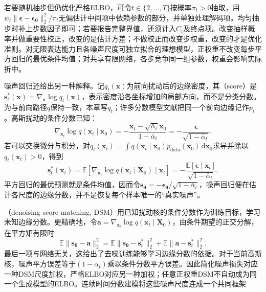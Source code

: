 若要随机抽步但仍优化严格ELBO，可令$t\in\{2,\ldots,T\}$按概率$\pi_t>0$抽取，用$w_t\lVert\bm{\epsilon}-\bm{\epsilon}_{\bm{\theta}}\rVert_2^2/\pi_t$无偏估计中间项中依赖参数的部分，并单独处理解码项。均匀抽步时补上步数因子即可；若要报告完整界值，还须计入$C_t$及终点项。改变抽样概率并做重要性校正，改变的是估计方差；不做校正而改变步权重，改变的才是优化准则。对无限表达能力且各噪声尺度可独立拟合的理想模型，正权重不改变每步平方回归的最优条件均值；对共享有限网络，各步竞争同一组参数，权重会影响实际折中。

噪声回归还给出另一种解释。记$q_t(\bm{x})$为前向扰动后的边缘密度，其（score）是$\bm{s}_t^*(\bm{x})=\nabla_{\bm{x}}\log q_t(\bm{x})$，表示密度沿各坐标增加的局部方向，而不是分类分数。为与前向路径$q$保持一致，本章写$q_t$；许多分数模型文献把同一个前向边缘记作$p_t$。高斯扰动的条件分数已知：
\[
  \nabla_{\bm{x}_t}\log q(\bm{x}_t\mid\bm{x}_0)
  =-\frac{\bm{x}_t-\sqrt{\bar{\alpha}_t}\bm{x}_0}
           {1-\bar{\alpha}_t}
  =-\frac{\bm{\epsilon}}{\sqrt{1-\bar{\alpha}_t}}.
\]
若可以交换微分与积分，对$q_t(\bm{x}_t)=\int q(\bm{x}_t\mid\bm{x}_0)p_{\mathrm{data}}(\bm{x}_0)\,\mathrm{d}\bm{x}_0$求导并除以$q_t(\bm{x}_t)>0$，得到
\begin{equation}
  \label{eq:pgm-generative-denoising-identity}
  \bm{s}_t^*(\bm{x}_t)
  =\mathbb{E}\!\left[
       \nabla_{\bm{x}_t}\log q(\bm{x}_t\mid\bm{X}_0)
       \mid\bm{x}_t\right]
  =-\frac{\mathbb{E}[\bm{\epsilon}\mid\bm{x}_t]}
            {\sqrt{1-\bar{\alpha}_t}}.
\end{equation}
平方回归的最优预测就是条件均值，因而令$\bm{s}_{\bm{\theta}}=-\bm{\epsilon}_{\bm{\theta}}/\sqrt{1-\bar{\alpha}_t}$，噪声回归便在估计各尺度的边缘分数，并不是恢复每个样本唯一的“真实噪声”。

（denoising score matching, DSM）用已知扰动核的条件分数作为训练目标，学习未知边缘分数。更精确地，令$\bm{a}=\nabla_{\bm{x}_t}\log q(\bm{x}_t\mid\bm{X}_0)$，由条件期望的正交分解，在平方矩有限时
\begin{equation}
  \label{eq:pgm-generative-dsm-decomposition}
  \mathbb{E}\lVert\bm{s}_{\bm{\theta}}-\bm{a}\rVert_2^2
  =\mathbb{E}\lVert\bm{s}_{\bm{\theta}}-\bm{s}_t^*\rVert_2^2
   +\mathbb{E}\lVert\bm{a}-\bm{s}_t^*\rVert_2^2.
\end{equation}
最后一项与网络无关，这给出了去噪训练能够学习边缘分数的依据。对于当前高斯核，噪声平方误差等于$(1-\bar{\alpha}_t)$乘以条件分数平方误差。因此简化噪声损失对应一种DSM尺度加权，严格ELBO对应另一种加权；任意正权重DSM不自动成为同一个生成模型的ELBO。连续时间分数建模将这些噪声尺度连成一个共同框架

